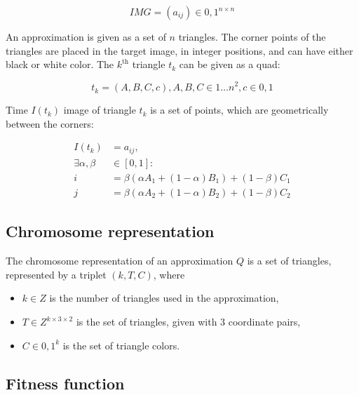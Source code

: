 \documentclass[conference]{IEEEtran}
\begin{document}
\begin{equation}
	IMG = (a_{ij}) \in {0,1}^{n \times n}
\end{equation}

An approximation is given as a set of $n$ triangles. The corner points of
the triangles are placed in the target image, in integer positions,
and can have either black or white color. The $k^\text{th}$ triangle
$t_k$ can be given as a quad:

\begin{equation}
	t_k = (A, B, C, c), A, B, C \in {1 \dots n}^2, c \in {0, 1}
\end{equation}

Time $I(t_k)$ image of triangle $t_k$ is a set of points, which are geometrically
between the corners:

\begin{equation}
	\begin{split}
	I(t_k) &= {a_{ij}},\\
	\exists \alpha, \beta &\in [0, 1]:\\
	i &= \beta(\alpha A_1 + (1-\alpha)B_1)+(1-\beta)C_1\\
	j &= \beta(\alpha A_2 + (1-\alpha)B_2)+(1-\beta)C_2
	\end{split}
\end{equation}

\subsection{Chromosome representation}

The chromosome representation of an approximation $Q$ is
a set of triangles, represented by a triplet $(k, T, C)$, where

\begin{itemize}

	\item{$k \in Z$ is the number of triangles used in the approximation,}

	\item{$T \in Z^{k \times 3 \times 2}$ is the set of triangles,
	given with 3 coordinate pairs,}

	\item{$C \in {0,1}^k$ is the set of triangle colors.}

\end{itemize}

\subsection{Fitness function}
\end{document}
